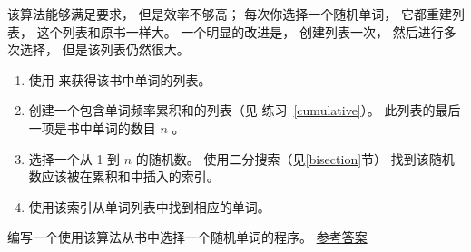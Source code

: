 
该算法能够满足要求， 但是效率不够高；
每次你选择一个随机单词， 它都重建列表， 这个列表和原书一样大。  
一个明显的改进是， 创建列表一次， 然后进行多次选择，  但是该列表仍然很大。  

\begin{enumerate}

\item 使用  来获得该书中单词的列表。  


\item 创建一个包含单词频率累积和的列表（见 练习~\ref{cumulative}）。    此列表的最后一项是书中单词的数目 $n$ 。  


\item 选择一个从 1 到 $n$ 的随机数。   使用二分搜索（见\ref{bisection}节）  找到该随机数应该被在累积和中插入的索引。  


\item 使用该索引从单词列表中找到相应的单词。  
\end{enumerate}

\begin{exercise}
\label{randhist}
\end{exercise}

编写一个使用该算法从书中选择一个随机单词的程序。  
\href{http://thinkpython2.com/code/analyze_book3.py}{参考答案}


